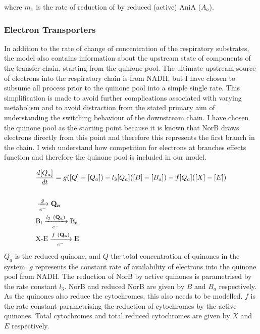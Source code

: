 where $m_{1}$ is the rate of reduction of \cNitrite{} by reduced (active) AniA ($A_a$).

\subsubsection{Electron Transporters}

In addition to the rate of change of concentration of the respiratory substrates, the model also contains information about the upstream state of components of the transfer chain, starting from the quinone pool. The ultimate upstream source of electrons into the respiratory chain is from NADH, but I have chosen to subsume all process prior to the quinone pool into a simple single rate. This simplification is made to avoid further complications associated with varying metabolism and to avoid distraction from the stated primary aim of understanding the switching behaviour of the downstream chain. I have chosen the quinone pool as the starting point because it is known that NorB draws electrons directly from this point and therefore this represents the first branch in the chain. I wish understand how competition for electrons at branches effects function and therefore the quinone pool is included in our model.

\begin{eqnarray}
&\frac{d[Q_a]}{dt} = g([Q] - [Q_a]) - l_3[Q_a]([B] - [B_a]) - f[Q_a]([X]-[E]) \nonumber \\\nonumber \\
&\xrightarrow[e^-]{g} \mathbf{Q_a} \nonumber \\
&\textnormal{B$_\textnormal{i}$} \xrightarrow[e^-]{l_3~(\mathbf{Q_a})} \textnormal{B$_\textnormal{a}$} \nonumber \\
&\textnormal{X-E} \xrightarrow[e^-]{f~(\mathbf{Q_a})} \textnormal{E}
\label{eq:quinones}
\end{eqnarray}
$Q_a$ is the reduced quinone, and $Q$ the total concentration of quinones in the system. $g$ represents the constant rate of availability of electrons into the quinone pool from NADH. The reduction of NorB by active quinones is parametrised by the rate constant $l_3$. NorB and reduced NorB are given by $B$ and $B_a$ respectively. As the quinones also reduce the cytochromes, this also needs to be modelled. $f$ is the rate constant parametrising the reduction of cytochromes by the active quinones. Total cytochromes and total reduced cytochromes are given by $X$ and $E$ respectively.

